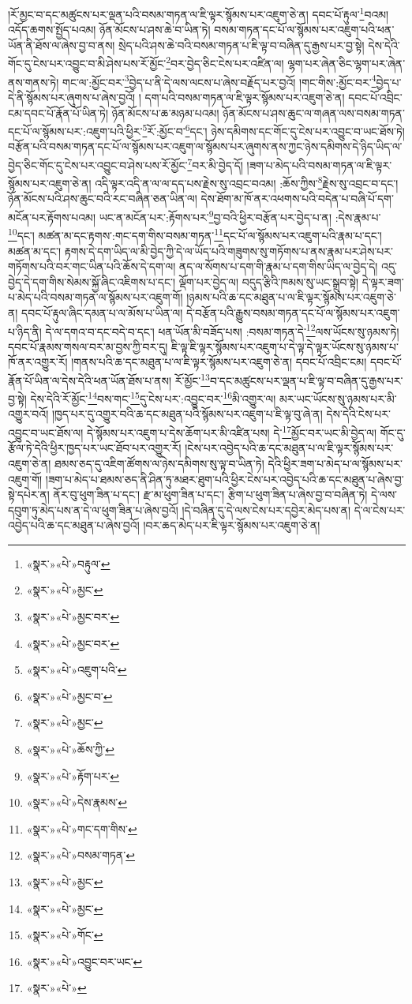 །རོ་མྱང་བ་དང་མཚུངས་པར་ལྡན་པའི་བསམ་གཏན་ལ་ཇི་ལྟར་སྙོམས་པར་འཇུག་ཅེ་ན། དབང་པོ་རྟུལ་\footnote{«སྣར་»«པེ་»བརྟུལ་}བའམ། འདོད་ཆགས་སྤྱོད་པའམ། ཉོན་མོངས་པ་ཤས་ཆེ་བ་ཡིན་ཏེ། བསམ་གཏན་དང་པོ་ལ་སྙོམས་པར་འཇུག་པའི་ཕན་ཡོན་ནི་ཐོས་ལ་ཞེས་བྱ་བ་ནས། སྲེད་པའི་ཤས་ཆེ་བའི་བསམ་གཏན་པ་ཇི་ལྟ་བ་བཞིན་དུ་རྒྱས་པར་བྱ་སྟེ། དེས་དེའི་གོང་དུ་ངེས་པར་འབྱུང་བ་མི་ཤེས་པས་རོ་མྱོང་\footnote{«སྣར་»«པེ་»མྱང་}བར་བྱེད་ཅིང་ངེས་པར་འཛིན་ལ། ལྷག་པར་ཞེན་ཅིང་ལྷག་པར་ཞེན་ནས་གནས་ཏེ། གང་ལ་:མྱོང་བར་\footnote{«སྣར་»«པེ་»མྱང་བར་}བྱེད་པ་ནི་དེ་ལས་ལངས་པ་ཞེས་བརྗོད་པར་བྱའོ། །གང་གིས་:མྱོང་བར་\footnote{«སྣར་»«པེ་»མྱང་བར་}བྱེད་པ་དེ་ནི་སྙོམས་པར་ཞུགས་པ་ཞེས་བྱའོ། །
དག་པའི་བསམ་གཏན་ལ་ཇི་ལྟར་སྙོམས་པར་འཇུག་ཅེ་ན། དབང་པོ་འབྲིང་ངམ་དབང་པོ་རྣོན་པོ་ཡིན་ཏེ། ཉོན་མོངས་པ་ཆ་མཉམ་པའམ། ཉོན་མོངས་པ་ཤས་ཆུང་ལ་གཞན་ལས་བསམ་གཏན་དང་པོ་ལ་སྙོམས་པར་:འཇུག་པའི་ཕྱིར་\footnote{«སྣར་»«པེ་»འཇུག་པའི་}རོ་:མྱོང་བ་\footnote{«སྣར་»«པེ་»མྱང་བ་}དང་། ཉེས་དམིགས་དང་གོང་དུ་ངེས་པར་འབྱུང་བ་ཡང་ཐོས་ཏེ། བརྩོན་པའི་བསམ་གཏན་དང་པོ་ལ་སྙོམས་པར་འཇུག་ལ་སྙོམས་པར་ཞུགས་ནས་ཀྱང་ཉེས་དམིགས་དེ་ཉིད་ཡིད་ལ་བྱེད་ཅིང་གོང་དུ་ངེས་པར་འབྱུང་བ་ཤེས་པས་རོ་མྱོང་\footnote{«སྣར་»«པེ་»མྱང་}བར་མི་བྱེད་དོ། །ཟག་པ་མེད་པའི་བསམ་གཏན་ལ་ཇི་ལྟར་སྙོམས་པར་འཇུག་ཅེ་ན། འདི་ལྟར་འདི་ན་ལ་ལ་དད་པས་རྗེས་སུ་འབྲང་བའམ། :ཆོས་ཀྱིས་\footnote{«སྣར་»«པེ་»ཆོས་ཀྱི་}རྗེས་སུ་འབྲང་བ་དང་། ཉོན་མོངས་པའི་ཤས་ཆུང་བའི་རང་བཞིན་ཅན་ཡིན་ལ། དེས་ཐོག་མ་ཁོ་ནར་འཕགས་པའི་བདེན་པ་བཞི་པོ་དག་མངོན་པར་རྟོགས་པའམ། ཡང་ན་མངོན་པར་:རྟོགས་པར་\footnote{«སྣར་»«པེ་»རྟོག་པར་}བྱ་བའི་ཕྱིར་བརྩོན་པར་བྱེད་པ་ན། :དེས་རྣམ་པ་\footnote{«སྣར་»«པེ་»དེས་རྣམས་}དང་། མཚན་མ་དང་རྟགས་:གང་དག་གིས་བསམ་གཏན་\footnote{«སྣར་»«པེ་»གང་དག་གིས་}དང་པོ་ལ་སྙོམས་པར་འཇུག་པའི་རྣམ་པ་དང་། མཚན་མ་དང་། རྟགས་དེ་དག་ཡིད་ལ་མི་བྱེད་ཀྱི་དེ་ལ་ཡོད་པའི་གཟུགས་སུ་གཏོགས་པ་ནས་རྣམ་པར་ཤེས་པར་གཏོགས་པའི་བར་གང་ཡིན་པའི་ཆོས་དེ་དག་ལ། ནད་ལ་སོགས་པ་དག་གི་རྣམ་པ་དག་གིས་ཡིད་ལ་བྱེད་དེ། འདུ་བྱེད་དེ་དག་གིས་སེམས་སྐྱོ་ཞིང་འཇིགས་པ་དང་། ལྡོག་པར་བྱེད་ལ། བདུད་རྩིའི་ཁམས་སུ་ཡང་སྒྲུབ་སྟེ། དེ་ལྟར་ཟག་པ་མེད་པའི་བསམ་གཏན་ལ་སྙོམས་པར་འཇུག་གོ། །ཉམས་པའི་ཆ་དང་མཐུན་པ་ལ་ཇི་ལྟར་སྙོམས་པར་འཇུག་ཅེ་ན། དབང་པོ་རྟུལ་ཞིང་དམན་པ་ལ་མོས་པ་ཡིན་ལ། དེ་བརྩོན་པའི་རྒྱུས་བསམ་གཏན་དང་པོ་ལ་སྙོམས་པར་འཇུག་པ་ཉིད་ནི། དེ་ལ་དགའ་བ་དང་བདེ་བ་དང་། ཕན་ཡོན་མི་བཟོད་པས། :བསམ་གཏན་དེ་\footnote{«སྣར་»«པེ་»བསམ་གཏན་}ལས་ཡོངས་སུ་ཉམས་ཏེ། དབང་པོ་རྣམས་གསལ་བར་མ་བྱས་ཀྱི་བར་དུ། ཇི་ལྟ་ཇི་ལྟར་སྙོམས་པར་འཇུག་པ་དེ་ལྟ་དེ་ལྟར་ཡོངས་སུ་ཉམས་པ་ཁོ་ནར་འགྱུར་རོ། །གནས་པའི་ཆ་དང་མཐུན་པ་ལ་ཇི་ལྟར་སྙོམས་པར་འཇུག་ཅེ་ན། དབང་པོ་འབྲིང་ངམ། དབང་པོ་རྣོན་པོ་ཡིན་ལ་དེས་དེའི་ཕན་ཡོན་ཐོས་པ་ནས། རོ་མྱོང་\footnote{«སྣར་»«པེ་»མྱང་}བ་དང་མཚུངས་པར་ལྡན་པ་ཇི་ལྟ་བ་བཞིན་དུ་རྒྱས་པར་བྱ་སྟེ། དེས་དེའི་རོ་མྱོང་\footnote{«སྣར་»«པེ་»མྱང་}བས་གང་\footnote{«སྣར་»«པེ་»གོང་}དུ་ངེས་པར་:འབྱུང་བར་\footnote{«སྣར་»«པེ་»འབྱུང་བར་ཡང་}མི་འགྱུར་ལ། མར་ཡང་ཡོངས་སུ་ཉམས་པར་མི་འགྱུར་བའོ། །ཁྱད་པར་དུ་འགྱུར་བའི་ཆ་དང་མཐུན་པའི་སྙོམས་པར་འཇུག་པ་ཇི་ལྟ་བུ་ཞེ་ན། དེས་དེའི་ངེས་པར་འབྱུང་བ་ཡང་ཐོས་ལ། དེ་སྙོམས་པར་འཇུག་པ་དེས་ཆོག་པར་མི་འཛིན་པས། དེ་\footnote{«སྣར་»«པེ་»}མྱོང་བར་ཡང་མི་བྱེད་ལ། གོང་དུ་རྩོལ་ཏེ་དེའི་ཕྱིར་ཁྱད་པར་ཡང་ཐོབ་པར་འགྱུར་རོ། །ངེས་པར་འབྱེད་པའི་ཆ་དང་མཐུན་པ་ལ་ཇི་ལྟར་སྙོམས་པར་འཇུག་ཅེ་ན། ཐམས་ཅད་དུ་འཇིག་ཚོགས་ལ་ཉེས་དམིགས་སུ་ལྟ་བ་ཡིན་ཏེ། དེའི་ཕྱིར་ཟག་པ་མེད་པ་ལ་སྙོམས་པར་འཇུག་གོ། །ཟག་པ་མེད་པ་ཐམས་ཅད་ནི་ཤིན་ཏུ་མཐར་ཐུག་པའི་ཕྱིར་ངེས་པར་འབྱེད་པའི་ཆ་དང་མཐུན་པ་ཞེས་བྱ་སྟེ་དཔེར་ན། ནོར་བུ་ཕུག་ཟིན་པ་དང་། རྫ་མ་ཕུག་ཟིན་པ་དང་། རྩིག་པ་ཕུག་ཟིན་པ་ཞེས་བྱ་བ་བཞིན་ཏེ། དེ་ལས་དབུག་ཏུ་མེད་པས་ན་དེ་ལ་ཕུག་ཟིན་པ་ཞེས་བྱའོ། །དེ་བཞིན་དུ་དེ་ལས་ངེས་པར་དབྱེར་མེད་པས་ན། དེ་ལ་ངེས་པར་འབྱེད་པའི་ཆ་དང་མཐུན་པ་ཞེས་བྱའོ། །བར་ཆད་མེད་པར་ཇི་ལྟར་སྙོམས་པར་འཇུག་ཅེ་ན། 